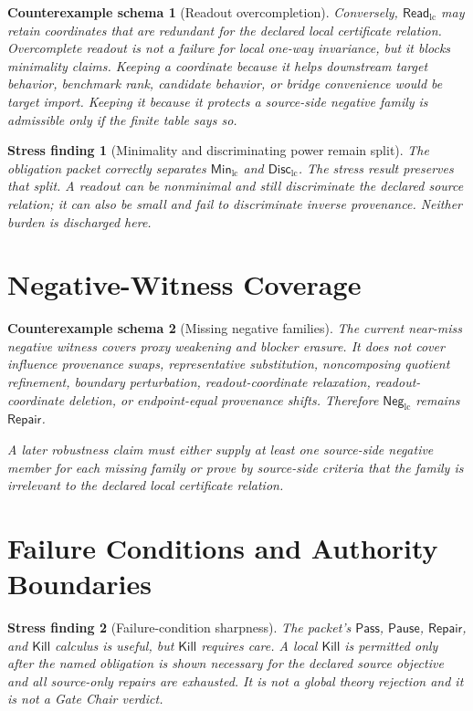 \documentclass[11pt]{article}
\newcommand{\ReadLC}{\mathsf{Read}_{\mathrm{lc}}}
\newcommand{\MinLC}{\mathsf{Min}_{\mathrm{lc}}}
\newcommand{\DiscLC}{\mathsf{Disc}_{\mathrm{lc}}}
\newcommand{\NegLC}{\mathsf{Neg}_{\mathrm{lc}}}
\newcommand{\Pass}{\mathsf{Pass}}
\newcommand{\Pause}{\mathsf{Pause}}
\newcommand{\Repair}{\mathsf{Repair}}
\newcommand{\Kill}{\mathsf{Kill}}
\newtheorem{counterexample}{Counterexample schema}
\newtheorem{stressfinding}{Stress finding}
\begin{document}
\begin{counterexample}[Readout overcompletion]
Conversely, \(\ReadLC\) may retain coordinates that are redundant for
the declared local certificate relation. Overcomplete readout is not a
failure for local one-way invariance, but it blocks minimality claims.
Keeping a coordinate because it helps downstream target behavior,
benchmark rank, candidate behavior, or bridge convenience would be
target import. Keeping it because it protects a source-side negative
family is admissible only if the finite table says so.
\end{counterexample}

\begin{stressfinding}[Minimality and discriminating power remain split]
The obligation packet correctly separates \(\MinLC\) and \(\DiscLC\).
The stress result preserves that split. A readout can be nonminimal and
still discriminate the declared source relation; it can also be small
and fail to discriminate inverse provenance. Neither burden is
discharged here.
\end{stressfinding}

\section{Negative-Witness Coverage}

\begin{counterexample}[Missing negative families]
The current near-miss negative witness covers proxy weakening and
blocker erasure. It does not cover influence provenance swaps,
representative substitution, noncomposing quotient refinement,
boundary perturbation, readout-coordinate relaxation,
readout-coordinate deletion, or endpoint-equal provenance shifts.
Therefore \(\NegLC\) remains \(\Repair\).

A later robustness claim must either supply at least one source-side
negative member for each missing family or prove by source-side
criteria that the family is irrelevant to the declared local
certificate relation.
\end{counterexample}

\section{Failure Conditions and Authority Boundaries}

\begin{stressfinding}[Failure-condition sharpness]
The packet's \(\Pass\), \(\Pause\), \(\Repair\), and \(\Kill\)
calculus is useful, but \(\Kill\) requires care. A local \(\Kill\) is
permitted only after the named obligation is shown necessary for the
declared source objective and all source-only repairs are exhausted.
It is not a global theory rejection and it is not a Gate Chair verdict.
\end{stressfinding}
\end{document}
